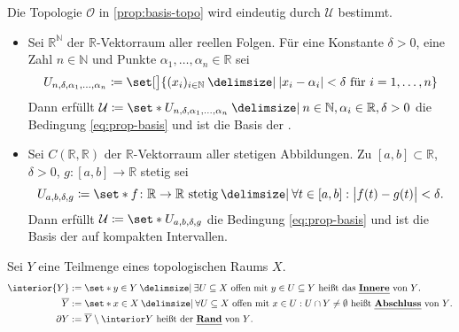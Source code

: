 \begin{bemerkung}[{name=[Eindeutigkeit der Topologie aus \cref{prop:basis-topo}]}]
	Die Topologie $\mathcal{O}$ in \cref{prop:basis-topo} wird eindeutig durch $\mathcal{U}$ bestimmt.
\end{bemerkung}

\begin{beispiel}[{name=[Topologien definiert durch Basen]},label=bsp:pktw-konv]
	\begin{itemize}
		\item Sei $\mathbb{R}^\mathbb{N}$ der $\mathbb{R}$-Vektorraum aller reellen Folgen.
		Für eine Konstante $\delta >0$, eine Zahl $n \in \mathbb{N}$ und Punkte $\alpha_1, \ldots , \alpha_n \in \mathbb{R}$ sei
		\[
			U_{n, \delta , \alpha_1, \ldots , \alpha_n} \coloneqq \set[\big]{(x_i)_{i \in \mathbb{N}} \given \abs*{x_i - \alpha_i} < \delta \text{ für } i=1, \ldots ,n }
		\]
		Dann erfüllt $\mathcal{U} \coloneqq \set*{U_{n, \delta , \alpha_1, \ldots , \alpha_n} \given n \in \mathbb{N}, \alpha_i \in \mathbb{R}, \delta >0}$ die Bedingung \eqref{eq:prop-basis} und ist die Basis der .
		\item Sei $C(\mathbb{R},\mathbb{R})$ der $\mathbb{R}$-Vektorraum aller stetigen Abbildungen.
		Zu $[a,b] \subset \mathbb{R}$, $\delta >0$, $g \colon [a,b] \to \mathbb{R}$ stetig sei
		\[
			U_{a,b, \delta , g} \coloneqq \set*{f \colon \mathbb{R} \to \mathbb{R} \text{ stetig} \given \forall t \in [a,b] : \abs[\big]{f(t)- g(t)}< \delta}.
		\]
		Dann erfüllt $\mathcal{U} \coloneqq \set*{U_{a,b,\delta ,g}}$ die Bedingung \eqref{eq:prop-basis} und ist die Basis der  auf kompakten Intervallen.
	\end{itemize}
\end{beispiel}

\begin{definition}[{name=[{Inneres, Abschluss und Rand einer Teilmenge}]}]
	Sei $Y$ eine Teilmenge eines topologischen Raums $X$.
	\begin{align*}
		\interior{Y} &:= \set*{y \in Y \given  \exists U \subseteq X \text{ offen mit } y \in U \subseteq Y} \text{ heißt das \Index{Innere} von $Y$.} \\
		\overline{Y} &:= \set*{x \in X \given \forall U \subseteq X \text{ offen mit } x \in U : U \cap Y \not= \emptyset}    \text{ heißt \Index{Abschluss} von $Y$.} \\
		\partial Y &:= \overline{Y} \setminus \interior Y \text{ heißt der \Index{Rand} von $Y$.}
	\end{align*}
\end{definition}

